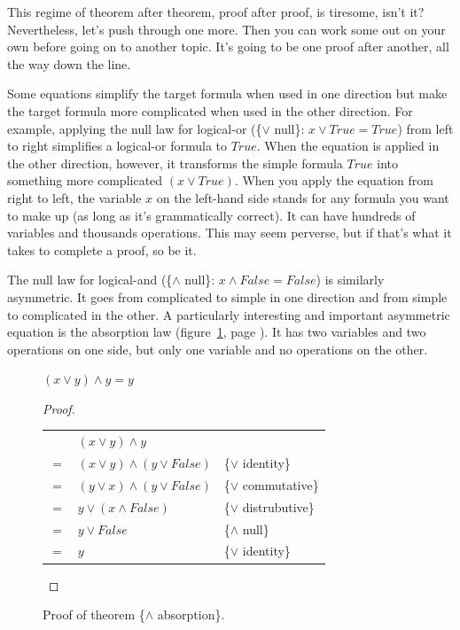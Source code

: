 This regime of theorem after theorem, proof after proof, is tiresome, isn't it?
Nevertheless, let's push through one more.
Then you can work some out on your own before going on to another topic.
It's going to be one proof after another, all the way down the line.

Some equations simplify the target formula when used in one direction
but make the target formula more complicated when used in the other direction.
For example, applying
the null law for logical-or (\{$\vee$ null\}: $x \vee True = True$)
from left to right simplifies a logical-or formula to $True$.
When the equation is applied in the other direction, however,
it transforms the simple formula $True$ into something more complicated $(x \vee True)$.
When you apply the equation from right to left,
the variable $x$ on the left-hand side
stands for any formula you want to make up (as long as it's grammatically correct).
It can have hundreds of variables and thousands operations.
This may seem perverse, but if that's what it takes to complete a proof, so be it.

The null law for logical-and (\{$\wedge$ null\}: $x \wedge False = False$)
is similarly asymmetric.
It goes from complicated to simple in one direction
and from simple to complicated in the other.
A particularly interesting and important asymmetric equation
is the absorption law
(figure~\ref{and-absorption-thm}, page \pageref{and-absorption-thm}).
It has two variables and two operations on one side, but only one variable and no operations on the other.

\begin{figure}
\begin{theorem}
$(x \vee y) \wedge y = y$
\end{theorem}

\begin{proof}
\mbox{} \\
\begin{tabular}{llp{3.15in}}
    & $(x \vee y) \wedge y$                & \\
$=$ & $(x \vee y) \wedge (y \vee False)$   & \{$\vee$ identity\} \\
$=$ & $(y \vee x) \wedge (y \vee False)$   & \{$\vee$ commutative\} \\
$=$ & $y \vee (x \wedge False)$            & \{$\vee$ distrubutive\} \\
$=$ & $y \vee False$                       & \{$\wedge$ null\} \\
$=$ & $y$                                  & \{$\vee$ identity\} \\
\end{tabular}

\end{proof}
\caption{Proof of theorem \{$\wedge$ absorption\}.}
\label{and-absorption-thm}
\end{figure}


